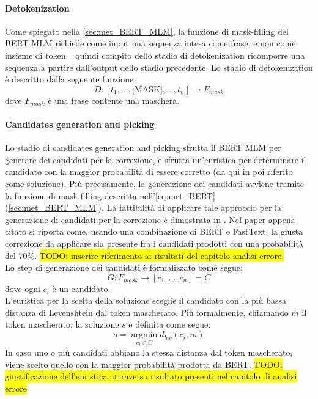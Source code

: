 \paragraph{Detokenization}
Come spiegato nella \autoref{sec:met_BERT_MLM}, la funzione di mask-filling del BERT MLM richiede come input una sequenza intesa come frase, e non come insieme di token. \E\ quindi compito dello stadio di detokenization ricomporre una sequenza a partire dall'output dello stadio precedente. Lo stadio di detokenization è descritto dalla seguente funzione:
\begin{equation}
D: [t_1,...,\text{[MASK]},...,t_n] \rightarrow F_{mask}
\end{equation}
dove $F_{mask}$ è una frase contente una maschera.

\paragraph{Candidates generation and picking}
Lo stadio di candidates generation and picking sfrutta il BERT MLM per generare dei candidati per la correzione, e sfrutta un'euristica per determinare il candidato con la maggior probabilità di essere corretto (da qui in poi riferito come soluzione). Più precisamente, la generazione dei candidati avviene tramite la funzione di mask-filling descritta nell'\autoref{eq:met_BERT} (\autoref{sec:met_BERT_MLM}). La fattibilità di applicare tale approccio per la generazione di candidati per la correzione è dimostrata in \cite{OCRMaskFilling}. Nel paper appena citato si riporta come, usando una combinazione di BERT e FastText, la giusta correzione da applicare sia presente fra i candidati prodotti con una probabilità del 70\%. \hl{TODO: inserire riferimento ai risultati del capitolo analisi errore.}\\
Lo step di generazione dei candidati è formalizzato come segue:
\begin{equation}
G: F_{mask} \rightarrow [c_1,...,c_n]= C
\end{equation}
dove ogni $c_i$ è un candidato.\\
L'euristica per la scelta della soluzione sceglie il candidato con la più bassa distanza di Levenshtein dal token mascherato. Più formalmente, chiamando $m$ il token mascherato, la soluzione $s$ è definita come segue:
\begin{equation}
s = \operatorname*{argmin}_{c_i \in C} d_{lev}(c_i,m)
\end{equation}
In caso uno o più candidati abbiano la stessa distanza dal token mascherato, viene scelto quello con la maggior probabilità prodotta da BERT.
\hl{TODO: giustificazione dell'euristica attraverso risultato presenti nel capitolo di analisi errore}

